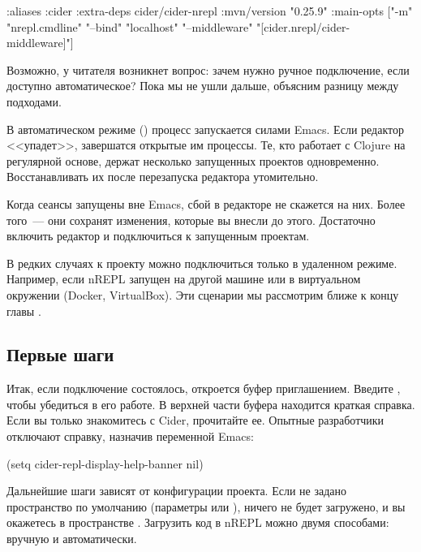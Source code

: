 \begin{english}
  \begin{clojure}
{:aliases
 {:cider
  {:extra-deps
   {cider/cider-nrepl {:mvn/version "0.25.9"}}
   :main-opts
   ["-m" "nrepl.cmdline"
    "--bind" "localhost"
    "--middleware" "[cider.nrepl/cider-middleware]"]}}}
  \end{clojure}
\end{english}

Возможно, у читателя возникнет вопрос: зачем нужно ручное подключение, если доступно автоматическое? Пока мы не ушли дальше, объясним разницу между подходами.

В автоматическом режиме () процесс  запускается силами Emacs. Если редактор <<упадет>>, завершатся открытые им процессы. Те, кто работает с Clojure на регулярной основе, держат несколько запущенных проектов одновременно. Восстанавливать их после перезапуска редактора утомительно.

Когда сеансы запущены вне Emacs, сбой в редакторе не скажется на них. Более того~--- они сохранят изменения, которые вы внесли до этого. Достаточно включить редактор и подключиться к запущенным проектам.

В редких случаях к проекту можно подключиться только в удаленном режиме. Например, если nREPL запущен на другой машине или в виртуальном окружении (Docker, VirtualBox). Эти сценарии мы рассмотрим ближе к концу главы .

\subsection{Первые шаги}

Итак, если подключение состоялось, откроется буфер  приглашением. Введите , чтобы убедиться в его работе. В верхней части буфера находится краткая справка. Если вы только знакомитесь с Cider, прочитайте ее. Опытные разработчики отключают справку, назначив  переменной Emacs:

\begin{english}
  \begin{lisp}
(setq cider-repl-display-help-banner nil)
  \end{lisp}
\end{english}

Дальнейшие шаги зависят от конфигурации проекта. Если не задано пространство по умолчанию (параметры  или  \arr {}), ничего не будет загружено, и вы окажетесь в пространстве . Загрузить код в nREPL можно двумя способами: вручную и автоматически.

